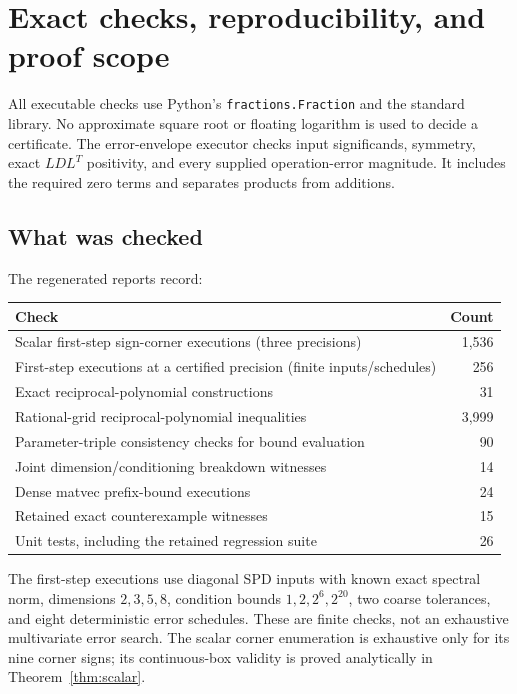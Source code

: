 \documentclass[11pt]{article}
\theoremstyle{remark}\newtheorem{remark}[theorem]{Remark}
\begin{document}
\section{Exact checks, reproducibility, and proof scope}
\label{sec:checks}

All executable checks use Python's \texttt{fractions.Fraction} and the
standard library. No approximate square root or floating logarithm is
used to decide a certificate. The error-envelope executor checks input
significands, symmetry, exact $LDL^T$ positivity, and every supplied
operation-error magnitude. It includes the required zero terms and
separates products from additions.

\subsection{What was checked}

The regenerated reports record:
\begin{center}
\begin{tabular}{p{}r}
\toprule
Check & Count\\
\midrule
Scalar first-step sign-corner executions (three precisions) & 1,536\\
First-step executions at a certified precision (finite inputs/schedules) & 256\\
Exact reciprocal-polynomial constructions & 31\\
Rational-grid reciprocal-polynomial inequalities & 3,999\\
Parameter-triple consistency checks for bound evaluation & 90\\
Joint dimension/conditioning breakdown witnesses & 14\\
Dense matvec prefix-bound executions & 24\\
Retained exact counterexample witnesses & 15\\
Unit tests, including the retained regression suite & 26\\
\bottomrule
\end{tabular}
\end{center}
The first-step executions use diagonal SPD inputs with known exact
spectral norm, dimensions $2,3,5,8$, condition bounds
$1,2,2^6,2^{20}$, two coarse tolerances, and eight deterministic error
schedules. These are finite checks, not an exhaustive multivariate
error search. The scalar corner enumeration is exhaustive only for its
nine corner signs; its continuous-box validity is proved analytically
in Theorem~\ref{thm:scalar}.
\end{document}
